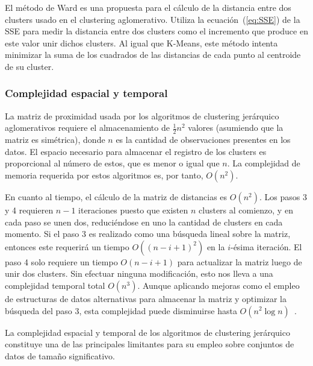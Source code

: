 El método de Ward es una propuesta para el cálculo de la distancia entre dos clusters usado en el clustering aglomerativo.
Utiliza la ecuación~(\ref{eq:SSE}) de la SSE para medir la distancia entre dos clusters como el incremento que produce en este valor unir dichos clusters.
Al igual que K-Means, este método intenta minimizar la suma de los cuadrados de las distancias de cada punto al centroide de su cluster.

\subsubsection{Complejidad espacial y temporal}

La matriz de proximidad usada por los algoritmos de clustering jerárquico aglomerativos requiere el almacenamiento de $\frac{1}{2}n^2$ valores (asumiendo que la matriz es simétrica), donde $n$ es la cantidad de observaciones presentes en los datos.
El espacio necesario para almacenar el registro de los clusters es proporcional al número de estos, que es menor o igual que $n$.
La complejidad de memoria requerida por estos algoritmos es, por tanto, $O(n^2)$.

En cuanto al tiempo, el cálculo de la matriz de distancias es $O(n^2)$.
Los pasos 3 y 4 requieren $n-1$ iteraciones puesto que existen $n$ clusters al comienzo, y en cada paso se unen dos, reduciéndose en uno la cantidad de clusters en cada momento.
Si el paso 3 es realizado como una búsqueda lineal sobre la matriz, entonces este requerirá un tiempo $O((n-i+1)^2)$ en la $i$-ésima iteración.
El paso 4 solo requiere un tiempo $O(n-i+1)$ para actualizar la matriz luego de unir dos clusters.
Sin efectuar ninguna modificación, esto nos lleva a una complejidad temporal total $O(n^3)$.
Aunque aplicando mejoras como el empleo de estructuras de datos alternativas para almacenar la matriz y optimizar la búsqueda del paso 3, esta complejidad puede disminuirse hasta $O(n^2\log{n})$~\cite{Tan05}.

La complejidad espacial y temporal de los algoritmos de clustering jerárquico constituye una de las principales limitantes para su empleo sobre conjuntos de datos de tamaño significativo.